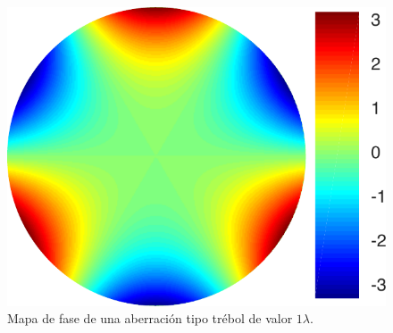 \begin{figure}[h!]
\centering
\includegraphics[scale=.5]{trefoil.pdf}
\caption[Aberración tipo trébol.]{Mapa de fase de una aberración tipo
  trébol de valor $1\lambda$.} 
\label{fig:trefoil_aber}
\end{figure} 


